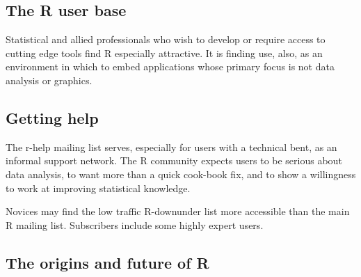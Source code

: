 \subsection*{The R user base}

Statistical and allied professionals who wish to
develop or require access to cutting edge tools find R especially
attractive.  It is finding use, also, as an environment in which to
embed applications whose primary focus is not data analysis or
graphics.

\subsection*{Getting help}

\begin{fullwidth}
\end{fullwidth}

The r-help mailing list  serves, especially
for users with a technical bent, as an informal support network.  The
R community expects users to be serious about data analysis, to want
more than a quick cook-book fix, and to show a willingness to work at
improving statistical knowledge.

Novices may find the low traffic R-downunder list more accessible
than the main R mailing list. Subscribers include some highly 
expert users.

\subsection*{The origins and future of R}

